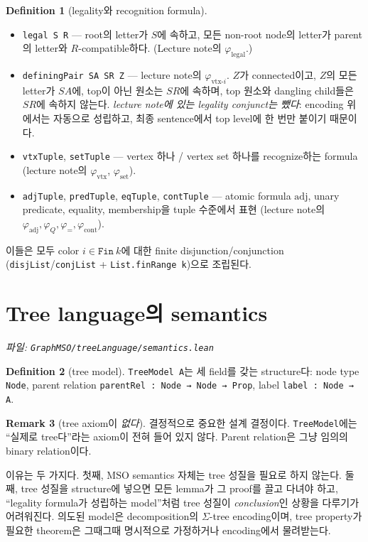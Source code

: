\documentclass[11pt]{article}
\theoremstyle{definition}
\newtheorem{definition}{Definition}[section]
\newtheorem{remark}[definition]{Remark}
\theoremstyle{plain}
\newcommand{\MSO}{\mathrm{MSO}}
\newcommand{\lean}[1]{\texttt{#1}}
\newcommand{\leanfile}[1]{\texttt{#1}}
\begin{document}
\begin{definition}[legality와 recognition formula]
\label{basics:def:recognitionformulas}
\begin{itemize}
  \item \lean{legal S R} --- root의 letter가 $S$에 속하고, 모든 non-root
    node의 letter가 parent의 letter와 $R$-compatible하다.
    (Lecture note의 $\varphi_{\mathrm{legal}}$.)
  \item \lean{definingPair SA SR Z} --- lecture note의
    $\varphi_{\mathrm{vtx}\text{-}i}$. $Z$가 connected이고, $Z$의 모든 letter가
    $SA$에, top이 아닌 원소는 $SR$에 속하며, top 원소와 dangling child들은
    $SR$에 속하지 않는다. \emph{lecture note에 있는 legality conjunct는 뺐다}:
    encoding 위에서는 자동으로 성립하고, 최종 sentence에서 top level에 한 번만
    붙이기 때문이다.
  \item \lean{vtxTuple}, \lean{setTuple} --- vertex 하나 / vertex set 하나를
    recognize하는 formula (lecture note의 $\varphi_{\mathrm{vtx}}$,
    $\varphi_{\mathrm{set}}$).
  \item \lean{adjTuple}, \lean{predTuple}, \lean{eqTuple}, \lean{contTuple}
    --- atomic formula $\mathrm{adj}$, unary predicate, equality, membership을
    tuple 수준에서 표현 (lecture note의
    $\varphi_{\mathrm{adj}}, \varphi_Q, \varphi_{=}, \varphi_{\mathrm{cont}}$).
\end{itemize}
이들은 모두 color $i \in \lean{Fin}\ k$에 대한 finite disjunction/conjunction
(\lean{disjList}/\lean{conjList} + \lean{List.finRange k})으로 조립된다.
\end{definition}

\section{Tree language의 semantics}
\label{basics:sec:treesem}

\emph{파일: \leanfile{GraphMSO/treeLanguage/semantics.lean}}

\begin{definition}[tree model]
\label{basics:def:treemodel}
\lean{TreeModel A}는 세 field를 갖는 structure다: node type \lean{Node},
parent relation \lean{parentRel : Node → Node → Prop}, label
\lean{label : Node → A}.
\end{definition}

\begin{remark}[tree axiom이 \emph{없다}]
\label{basics:rem:notree}
결정적으로 중요한 설계 결정이다. \lean{TreeModel}에는 ``실제로 tree다''라는
axiom이 전혀 들어 있지 않다. Parent relation은 그냥 임의의 binary relation이다.

이유는 두 가지다. 첫째, $\MSO$ semantics 자체는 tree 성질을 필요로 하지 않는다.
둘째, tree 성질을 structure에 넣으면 모든 lemma가 그 proof를 끌고 다녀야 하고,
``legality formula가 성립하는 model''처럼 tree 성질이 \emph{conclusion}인
상황을 다루기가 어려워진다. 의도된 model은 decomposition의 $\Sigma$-tree
encoding이며, tree property가 필요한 theorem은 그때그때 명시적으로 가정하거나
encoding에서 물려받는다.
\end{remark}
\end{document}
